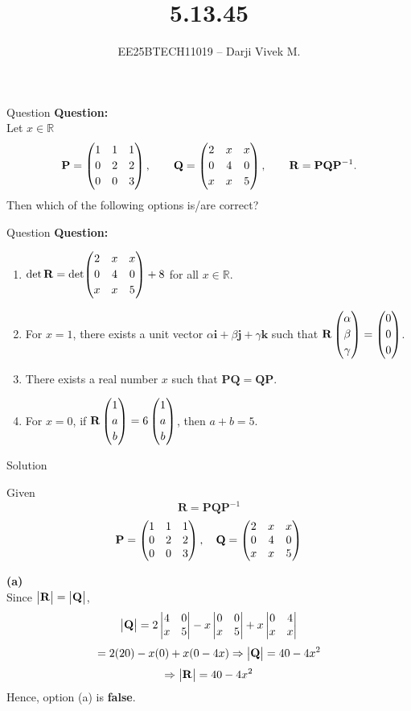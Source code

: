 \documentclass{beamer}
\title{5.13.45}
\author{EE25BTECH11019 -- Darji Vivek M.}
\date{}
\renewcommand{\vec}[1]{\mathbf{#1}}
\begin{document}
\begin{frame}
\begin{titlepage}

\end{titlepage}
\end{frame}

\begin{frame}{Question}
\textbf{Question:}\\[2pt]
Let $x\in\mathbb R$
\[
\vec{P}=\myvec{1 & 1 & 1\\[2pt] 0 & 2 & 2\\[2pt] 0 & 0 & 3},\qquad
\vec{Q}=\myvec{2 & x & x\\[2pt] 0 & 4 & 0\\[2pt] x & x & 5},\qquad
\vec{R}=\vec{P}\vec{Q}\vec{P}^{-1}.
\]
Then which of the following options is/are correct?\\[4pt]
\end{frame}

\begin{frame}{Question}
\textbf{Question:}\\[2pt]
\begin{enumerate}
\item $\det \vec{R}=\det\!\myvec{2 & x & x\\[2pt]0 & 4 & 0\\[2pt]x & x & 5}+8$ for all $x\in\mathbb R$.
\item For $x=1$, there exists a unit vector $\alpha\vec{i}+\beta\vec{j}+\gamma\vec{k}$ such that $\vec{R}\myvec{\alpha\\[2pt]\beta\\[2pt]\gamma}=\myvec{0\\[2pt]0\\[2pt]0}$.
\item There exists a real number $x$ such that $\vec{P}\vec{Q}=\vec{Q}\vec{P}$.
\item For $x=0$, if $\vec{R}\myvec{1\\[2pt]a\\[2pt]b}=6\myvec{1\\[2pt]a\\[2pt]b}$, then $a+b=5$.
\end{enumerate}
\end{frame}

\begin{frame}{Solution}

Given
\[
\vec{R} = \vec{P}\vec{Q}\vec{P}^{-1}
\]
\[
\vec{P}=\myvec{1 & 1 & 1\\ 0 & 2 & 2\\ 0 & 0 & 3}, \quad
\vec{Q}=\myvec{2 & x & x\\ 0 & 4 & 0\\ x & x & 5}
\]

\textbf{(a)}\\
Since $\mydet{\vec{R}}=\mydet{\vec{Q}}$,  
\[
\mydet{\vec{Q}} =
2\mydet{4 & 0\\ x & 5}
- x\mydet{0 & 0\\ x & 5}
+ x\mydet{0 & 4\\ x & x}
\]
\[
= 2(20) - x(0) + x(0 - 4x)
\Rightarrow \mydet{\vec{Q}} = 40 - 4x^2
\]
\[
\Rightarrow \mydet{\vec{R}} = 40 - 4x^2
\]
Hence, option (a) is \textbf{false}.
\end{frame}
\end{document}
